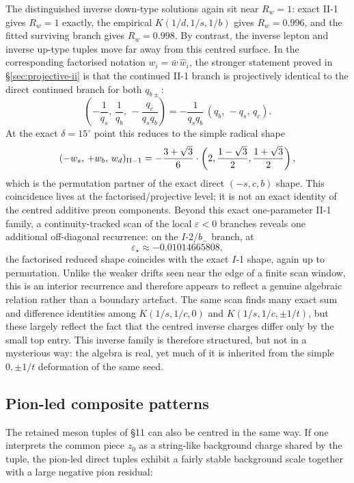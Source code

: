 \documentclass[11pt]{article}
\begin{document}
The distinguished inverse down-type solutions again sit near $R_w=1$:
exact II-1 gives $R_w=1$ exactly, the empirical
$K(1/d,1/s,1/b)$ gives $R_w=0.996$, and the fitted surviving branch gives
$R_w=0.998$.  By contrast, the inverse lepton and inverse up-type tuples
move far away from this centred surface.
In the corresponding factorised notation $w_i=\bar w\,\hat w_i$, the stronger
statement proved in \S\ref{sec:projective-ii} is that the continued II-1 branch is projectively
identical to the direct continued branch for both $q_{b\pm}$:
\[
  \left(-\frac{1}{q_s},\,\frac{1}{q_b},\,-\frac{q_c}{q_s q_b}\right)
  = -\frac{1}{q_s q_b}\,(q_b,\,-q_s,\,q_c).
\]
At the exact $\delta=15^\circ$ point this reduces to the simple radical shape
\[
  ( -w_s,\,+w_b,\,w_d )_{\rm II-1}
  = -\frac{3+\sqrt3}{6}\cdot\left(2,\frac{1-\sqrt3}{2},\frac{1+\sqrt3}{2}\right),
\]
which is the permutation partner of the exact direct $(-s,c,b)$ shape.
This coincidence lives at the factorised/projective level; it is not an exact
identity of the centred additive preon components.
Beyond this exact one-parameter II-1 family, a continuity-tracked scan of the
local $\varepsilon<0$ branches
reveals one additional off-diagonal recurrence: on the $I$-2/$b_-$ branch,
at
\[
  \varepsilon_\star \approx -0.01014665808,
\]
the factorised reduced shape coincides with the exact $I$-1 shape,
again up to permutation.  Unlike the weaker drifts seen near the edge of a
finite scan window, this is an interior recurrence and therefore appears to
reflect a genuine algebraic relation rather than a boundary artefact.
The same scan finds many exact sum and difference identities among
$K(1/s,1/c,0)$ and $K(1/s,1/c,\pm 1/t)$, but these largely reflect the
fact that the centred inverse charges differ only by the small top entry.
This inverse family is therefore structured, but not in a mysterious way:
the algebra is real, yet much of it is inherited from the simple
$0,\pm 1/t$ deformation of the same seed.

\subsection{Pion-led composite patterns}

The retained meson tuples of \S11 can also be centred in the same way.
If one interprets the common piece $z_0$ as a string-like background
charge shared by the tuple, the pion-led direct tuples exhibit a fairly
stable background scale together with a large negative pion residual:
\end{document}
